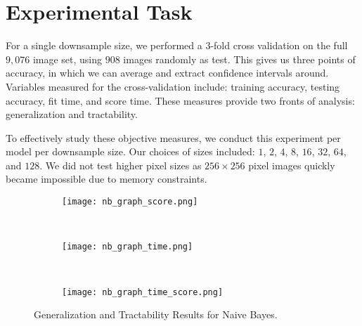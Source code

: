 \documentclass{article}
\begin{document}



\section{Experimental Task}
\label{sec:task}
For a single downsample size, we performed a $3$-fold cross validation on
the full $9,076$ image set, using $908$
images randomly as test. This gives us three points of accuracy, in which we
can average and extract confidence intervals around. Variables measured for the
cross-validation include: training accuracy, testing accuracy, fit time, and
score time. These measures provide two fronts of analysis: generalization and
tractability.

To effectively study these objective measures, we conduct this experiment
per model per downsample size. Our choices of sizes
included: $1$, $2$, $4$, $8$, $16$, $32$, $64$, and $128$. We did not test higher pixel sizes
as $256 \times 256$ pixel images quickly became impossible due to memory constraints.


\begin{figure}
  \centering
  \begin{subfigure}[b]{0.3\textwidth}
    \centering
    \texttt{[image: nb\_graph\_score.png]}
    \caption*{}
    \label{fig:nb_graph_score}
  \end{subfigure}
  ~
  \begin{subfigure}[b]{0.3\textwidth}
    \centering
    \texttt{[image: nb\_graph\_time.png]}
    \caption*{}
    \label{fig:nb_graph_time}
  \end{subfigure}
  ~
  \begin{subfigure}[b]{0.3\textwidth}
    \centering
    \texttt{[image: nb\_graph\_time\_score.png]}
    \caption*{}
    \label{fig:nb_graph_time_score}
  \end{subfigure}
  \vspace{-10pt}
  \caption{Generalization and Tractability Results for Naive Bayes.}
\end{figure}
\end{document}
